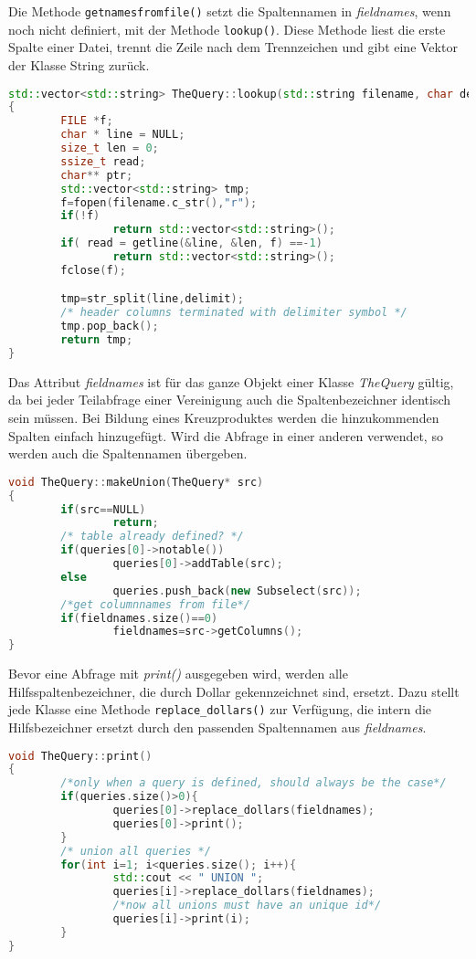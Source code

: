 Die Methode \lstinline{getnamesfromfile()} setzt die Spaltennamen in \textit{fieldnames}, wenn noch nicht definiert, mit der Methode \lstinline{lookup()}. Diese Methode liest die erste Spalte einer Datei, trennt die Zeile nach dem Trennzeichen und gibt eine Vektor der Klasse String zurück.
\begin{lstlisting}[language=C++]
std::vector<std::string> TheQuery::lookup(std::string filename, char delimit)
{
        FILE *f;
        char * line = NULL;
        size_t len = 0;
        ssize_t read;
        char** ptr;
        std::vector<std::string> tmp;
        f=fopen(filename.c_str(),"r");
        if(!f)
                return std::vector<std::string>();
        if( read = getline(&line, &len, f) ==-1)
                return std::vector<std::string>();
        fclose(f);

        tmp=str_split(line,delimit);
        /* header columns terminated with delimiter symbol */
        tmp.pop_back();
        return tmp;
}
\end{lstlisting}

Das Attribut \textit{fieldnames} ist für das ganze Objekt einer Klasse \textit{TheQuery} gültig, da bei jeder Teilabfrage einer Vereinigung auch die Spaltenbezeichner identisch sein müssen. Bei Bildung eines Kreuzproduktes werden die hinzukommenden Spalten einfach hinzugefügt. Wird die Abfrage in einer anderen verwendet, so werden auch die Spaltennamen übergeben.

\begin{lstlisting}[language=C++]
void TheQuery::makeUnion(TheQuery* src)
{
        if(src==NULL)
                return;
        /* table already defined? */
        if(queries[0]->notable())
                queries[0]->addTable(src);
        else
                queries.push_back(new Subselect(src));
        /*get columnnames from file*/
        if(fieldnames.size()==0)
                fieldnames=src->getColumns();
}
\end{lstlisting}

Bevor eine Abfrage mit \textit{print()} ausgegeben wird, werden alle Hilfsspaltenbezeichner, die durch Dollar gekennzeichnet sind, ersetzt. Dazu stellt jede Klasse eine Methode \lstinline{replace_dollars()} zur Verfügung, die intern die Hilfsbezeichner ersetzt durch den passenden Spaltennamen aus \textit{fieldnames}.

\begin{lstlisting}[language=C++]
void TheQuery::print()
{
        /*only when a query is defined, should always be the case*/
        if(queries.size()>0){
                queries[0]->replace_dollars(fieldnames);
                queries[0]->print();
        }
        /* union all queries */
        for(int i=1; i<queries.size(); i++){
                std::cout << " UNION ";
                queries[i]->replace_dollars(fieldnames);
                /*now all unions must have an unique id*/
                queries[i]->print(i);
        }
}
\end{lstlisting}

